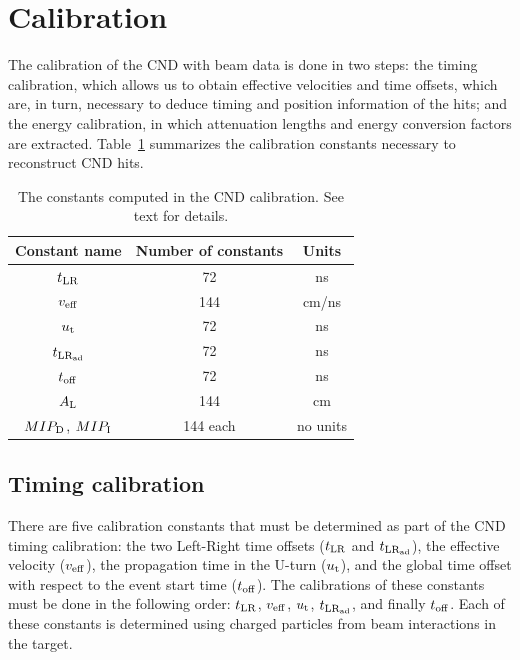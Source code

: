 \section{Calibration}\label{sec_cnd_calib}

The calibration of the CND with beam data is done in two steps: the timing calibration, which allows us to obtain effective velocities and time offsets, which are, in turn, necessary to deduce timing and position information of the hits; and the energy calibration, in which attenuation lengths and energy conversion factors are extracted.
Table~\ref{table_cnd_constants} summarizes the calibration constants necessary to reconstruct CND hits.

\begin{table}
\begin{tabular}{|c|c|c|}
\hline
Constant name & Number of constants  & Units \\
\hline
$t_{\rm{LR}}$ & 72 & ns\\
\hline
$v_{\rm{eff}}$ & 144 & cm/ns \\
\hline
$u_{\rm{t}}$ & 72 & ns \\
\hline
$t_{\rm{LR}_{\rm{ad}}}$ & 72 & ns \\
\hline
$t_{\rm{off}}$ &72 & ns\\
\hline
$A_{\rm{L}}$ & 144 & cm\\
\hline
$MIP_{\rm{D}}$, $MIP_{\rm{I}}$ & 144 each & no units \\
\hline
\end{tabular}
\caption{The constants computed in the CND calibration. See text for details.}
\label{table_cnd_constants}
\end{table}

\subsection{Timing calibration}
There are five calibration constants that must be determined as part of the CND timing calibration: the two Left-Right time offsets ($t_{\rm{LR}}$ and  $t_{\rm{LR}_{\rm{ad}}}$), the effective velocity ($v_{\rm{eff}}$), the propagation time in the U-turn ($u_{\rm{t}}$), and the global time offset with respect to the event start time ($t_{\rm{off}}$). The calibrations of these constants must be done in the following order: $t_{\rm{LR}}$, $v_{\rm{eff}}$, $u_{\rm{t}}$,  $t_{\rm{LR}_{\rm{ad}}}$, and finally $t_{\rm{off}}$. 
Each of these constants is determined using charged particles from beam interactions in the target.


